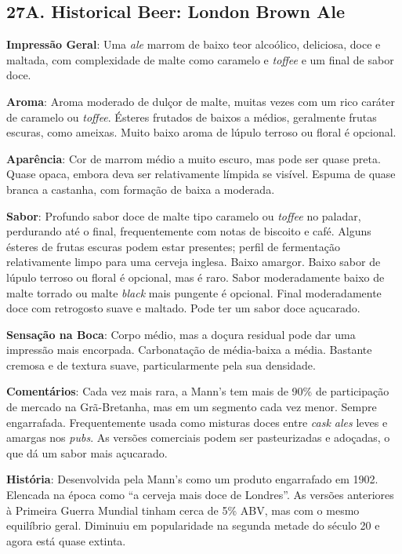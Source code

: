 \subsection*{27A. Historical Beer: London Brown Ale}
\textbf{Impressão Geral}: Uma \textit{ale} marrom de baixo teor alcoólico, deliciosa, doce e maltada, com complexidade de malte como caramelo e \textit{toffee} e um final de sabor doce.

\textbf{Aroma}: Aroma moderado de dulçor de malte, muitas vezes com um rico caráter de caramelo ou \textit{toffee}. Ésteres frutados de baixos a médios, geralmente frutas escuras, como ameixas. Muito baixo aroma de lúpulo terroso ou floral é opcional.

\textbf{Aparência}: Cor de marrom médio a muito escuro, mas pode ser quase preta. Quase opaca, embora deva ser relativamente límpida se visível. Espuma de quase branca a castanha, com formação de baixa a moderada.

\textbf{Sabor}: Profundo sabor doce de malte tipo caramelo ou \textit{toffee} no paladar, perdurando até o final, frequentemente com notas de biscoito e café. Alguns ésteres de frutas escuras podem estar presentes; perfil de fermentação relativamente limpo para uma cerveja inglesa. Baixo amargor. Baixo sabor de lúpulo terroso ou floral é opcional, mas é raro. Sabor moderadamente baixo de malte torrado ou malte \textit{black} mais pungente é opcional. Final moderadamente doce com retrogosto suave e maltado. Pode ter um sabor doce açucarado.

\textbf{Sensação na Boca}: Corpo médio, mas a doçura residual pode dar uma impressão mais encorpada. Carbonatação de média-baixa a média. Bastante cremosa e de textura suave, particularmente pela sua densidade.

\textbf{Comentários}: Cada vez mais rara, a Mann's tem mais de 90\% de participação de mercado na Grã-Bretanha, mas em um segmento cada vez menor. Sempre engarrafada. Frequentemente usada como misturas doces entre \textit{cask ales} leves e amargas nos \textit{pubs}. As versões comerciais podem ser pasteurizadas e adoçadas, o que dá um sabor mais açucarado.

\textbf{História}: Desenvolvida pela Mann's como um produto engarrafado em 1902. Elencada na época como “a cerveja mais doce de Londres”. As versões anteriores à Primeira Guerra Mundial tinham cerca de 5\% ABV, mas com o mesmo equilíbrio geral. Diminuiu em popularidade na segunda metade do século 20 e agora está quase extinta.

